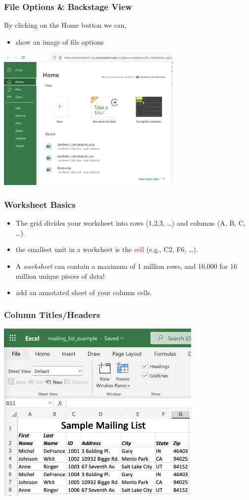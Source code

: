 \documentclass[12pt]{beamer}
\begin{document}
	\begin{frame}
		\frametitle{File Options \& Backstage View}
		By clicking on the Home button we can, 
		\begin{itemize}
			\item show an image of file options
		\end{itemize}
		\begin{center}
			\includegraphics[width=9cm]{FileTab.png}
		\end{center}	
\end{frame}

	\begin{frame}
		\frametitle{Worksheet Basics}
		\begin{itemize}
			\item The grid divides your worksheet into rows (1,2,3, \ldots)
			and columns (A, B, C, \ldots).
			\item the smallest unit in a worksheet is the \textcolor{red}{cell} (e.g., C2, F6, \ldots).
			\item A \textit{worksheet} can contain a maximum of 1 million rows, and 16,000 for 16 million unique pieces of data!
			\item add an annotated sheet of your column cells.
		\end{itemize}
	\end{frame}
	
	\begin{frame}
		\frametitle{Column Titles/Headers}
		\begin{center}
		\includegraphics[width=10cm]{ExampleWorkbook}
		\end{center}
	\end{frame}
\end{document}
